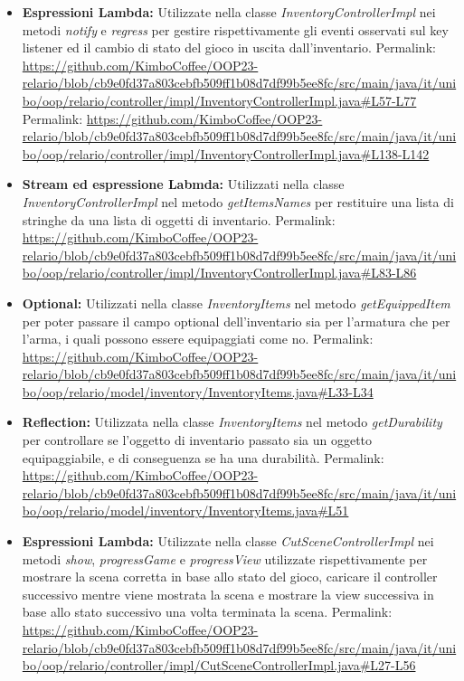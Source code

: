\documentclass[a4paper,12pt]{report}
\begin{document}
\begin{itemize}
	\item \textbf{Espressioni Lambda:} Utilizzate nella classe \textit{InventoryControllerImpl} nei metodi \textit{notify} e \textit{regress} per gestire rispettivamente
	gli eventi osservati sul key listener ed il cambio di stato del gioco in uscita dall'inventario.
	Permalink: \url{https://github.com/KimboCoffee/OOP23-relario/blob/cb9e0fd37a803cebfb509ff1b08d7df99b5ee8fc/src/main/java/it/unibo/oop/relario/controller/impl/InventoryControllerImpl.java#L57-L77}
	Permalink: \url{https://github.com/KimboCoffee/OOP23-relario/blob/cb9e0fd37a803cebfb509ff1b08d7df99b5ee8fc/src/main/java/it/unibo/oop/relario/controller/impl/InventoryControllerImpl.java#L138-L142}
	\item \textbf{Stream ed espressione Labmda:} Utilizzati nella classe \textit{InventoryControllerImpl} nel metodo \textit{getItemsNames} per restituire una lista di stringhe
	da una lista di oggetti di inventario.
	Permalink: \url{https://github.com/KimboCoffee/OOP23-relario/blob/cb9e0fd37a803cebfb509ff1b08d7df99b5ee8fc/src/main/java/it/unibo/oop/relario/controller/impl/InventoryControllerImpl.java#L83-L86}
	\item \textbf{Optional:} Utilizzati nella classe \textit{InventoryItems} nel metodo \textit{getEquippedItem} per poter passare il campo optional dell'inventario sia per l'armatura
	che per l'arma, i quali possono essere equipaggiati come no.
	Permalink: \url{https://github.com/KimboCoffee/OOP23-relario/blob/cb9e0fd37a803cebfb509ff1b08d7df99b5ee8fc/src/main/java/it/unibo/oop/relario/model/inventory/InventoryItems.java#L33-L34}
	\item \textbf{Reflection:} Utilizzata nella classe \textit{InventoryItems} nel metodo \textit{getDurability} per controllare se l'oggetto di inventario passato sia un oggetto
	equipaggiabile, e di conseguenza se ha una durabilità.
	Permalink: \url{https://github.com/KimboCoffee/OOP23-relario/blob/cb9e0fd37a803cebfb509ff1b08d7df99b5ee8fc/src/main/java/it/unibo/oop/relario/model/inventory/InventoryItems.java#L51}
	\item \textbf{Espressioni Lambda:} Utilizzate nella classe \textit{CutSceneControllerImpl} nei metodi \textit{show}, \textit{progressGame} e \textit{progressView} utilizzate
	rispettivamente per mostrare la scena corretta in base allo stato del gioco, caricare il controller successivo mentre viene mostrata la scena e mostrare la view successiva in
	base allo stato successivo una volta terminata la scena.
	Permalink: \url{https://github.com/KimboCoffee/OOP23-relario/blob/cb9e0fd37a803cebfb509ff1b08d7df99b5ee8fc/src/main/java/it/unibo/oop/relario/controller/impl/CutSceneControllerImpl.java#L27-L56}

\end{itemize}
\end{document}

